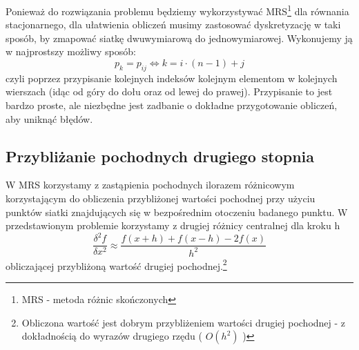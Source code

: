 \documentclass{article}
\begin{document}
Ponieważ do rozwiązania problemu będziemy
wykorzystywać MRS\footnote{MRS - metoda różnic skończonych} dla równania stacjonarnego, dla
ułatwienia obliczeń musimy zastosować dyskretyzację w taki sposób, by zmapować siatkę dwuwymiarową
do  jednowymiarowej. Wykonujemy ją w najprostszy możliwy sposób: \[p_k=p_{ij} \iff k=i\cdot (n-1)+j \]
czyli poprzez przypisanie kolejnych indeksów kolejnym elementom w kolejnych wierszach (idąc od góry 
do dołu oraz od lewej do prawej). Przypisanie to jest bardzo proste, ale niezbędne jest zadbanie o
 dokładne przygotowanie obliczeń, aby uniknąć błędów.
\subsection{Przybliżanie pochodnych drugiego stopnia}
W MRS korzystamy z zastąpienia pochodnych ilorazem różnicowym korzystającym do obliczenia przybliżonej
wartości pochodnej przy użyciu punktów siatki znajdujących się w bezpośrednim otoczeniu badanego punktu.
W przedstawionym problemie korzystamy z drugiej różnicy centralnej dla kroku h
\begin{equation}
\frac{\delta^2 f}{\delta x^2}\approx \frac{f(x+h)+f(x-h)-2f(x)}{h^2}
\end{equation}
obliczającej przybliżoną wartość drugiej pochodnej.\footnote{Obliczona wartość jest dobrym przybliżeniem wartości drugiej
pochodnej - z dokładnością do wyrazów drugiego rzędu ( $O(h^2)$ )}
\newpage
\end{document}
